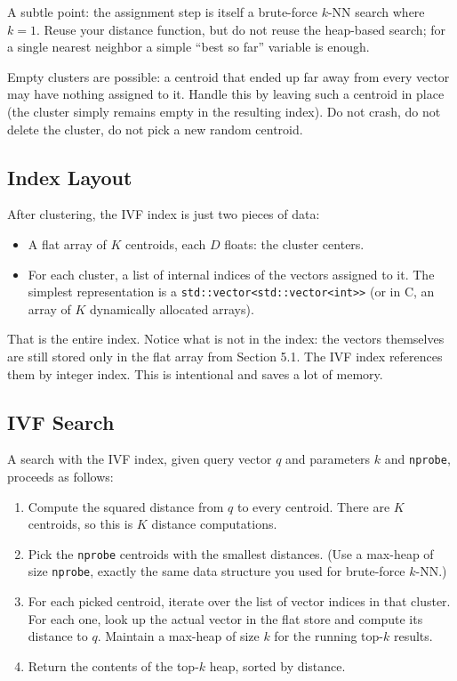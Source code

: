 \documentclass[11pt,a4paper]{article}
\begin{document}
A subtle point: the assignment step is itself a brute-force $k$-NN search where $k = 1$. Reuse your distance function, but do not reuse the heap-based search; for a single nearest neighbor a simple ``best so far'' variable is enough.

Empty clusters are possible: a centroid that ended up far away from every vector may have nothing assigned to it. Handle this by leaving such a centroid in place (the cluster simply remains empty in the resulting index). Do not crash, do not delete the cluster, do not pick a new random centroid.

\subsection{Index Layout}
After clustering, the IVF index is just two pieces of data:

\begin{itemize}
\item A flat array of $K$ centroids, each $D$ floats: the cluster centers.
\item For each cluster, a list of internal indices of the vectors assigned to it. The simplest representation is a \texttt{std::vector<std::vector<int>>} (or in C, an array of $K$ dynamically allocated arrays).
\end{itemize}

That is the entire index. Notice what is not in the index: the vectors themselves are still stored only in the flat array from Section 5.1. The IVF index references them by integer index. This is intentional and saves a lot of memory.

\subsection{IVF Search}
A search with the IVF index, given query vector $q$ and parameters $k$ and \texttt{nprobe}, proceeds as follows:

\begin{enumerate}
\item Compute the squared distance from $q$ to every centroid. There are $K$ centroids, so this is $K$ distance computations.
\item Pick the \texttt{nprobe} centroids with the smallest distances. (Use a max-heap of size \texttt{nprobe}, exactly the same data structure you used for brute-force $k$-NN.)
\item For each picked centroid, iterate over the list of vector indices in that cluster. For each one, look up the actual vector in the flat store and compute its distance to $q$. Maintain a max-heap of size $k$ for the running top-$k$ results.
\item Return the contents of the top-$k$ heap, sorted by distance.
\end{enumerate}
\end{document}
